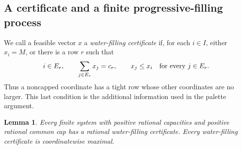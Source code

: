 \documentclass[11pt,a4paper]{article}
\newtheorem{lemma}[lemma]{Lemma}
\theoremstyle{definition}
\theoremstyle{remark}
\begin{document}
\subsection{A certificate and a finite progressive-filling process}

We call a feasible vector $x$ a \emph{water-filling certificate} if, for
each $i\in I$, either $x_i=M$, or there is a row $r$ such that
\begin{equation}\label{pack:certificate}
 i\in E_r,\qquad
 \sum_{j\in E_r}x_j=c_r,\qquad
 x_j\leq x_i\quad\hbox{for every }j\in E_r.
\end{equation}
Thus a noncapped coordinate has a tight row whose other coordinates are
no larger.  This last condition is the additional information used in the
palette argument.

\begin{lemma}\label{pack:existence}
Every finite system with positive rational capacities and positive
rational common cap has a rational water-filling certificate.
Every water-filling certificate is coordinatewise maximal.
\end{lemma}
\end{document}
